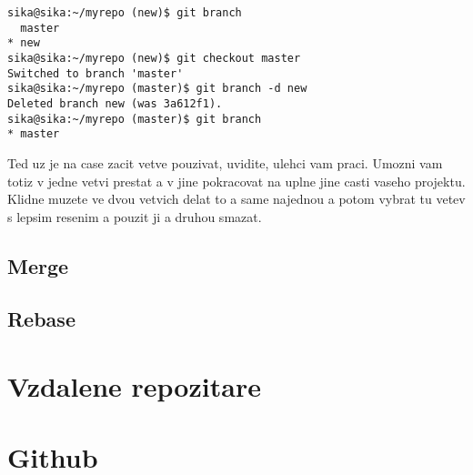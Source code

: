 \documentclass[12pt,a5paper]{article}
\begin{document}
\begin{lstlisting}
sika@sika:~/myrepo (new)$ git branch
  master
* new
sika@sika:~/myrepo (new)$ git checkout master
Switched to branch 'master'
sika@sika:~/myrepo (master)$ git branch -d new
Deleted branch new (was 3a612f1).
sika@sika:~/myrepo (master)$ git branch
* master
\end{lstlisting}

Ted uz je na case zacit vetve pouzivat, uvidite, ulehci vam praci. Umozni vam totiz v jedne vetvi prestat a v jine pokracovat na uplne jine casti vaseho projektu. Klidne muzete ve dvou vetvich delat to a same najednou a potom vybrat tu vetev s lepsim resenim a pouzit ji a druhou smazat.


\subsection{Merge}
\subsection{Rebase}
\section{Vzdalene repozitare}
\section{Github}

\end{document}
